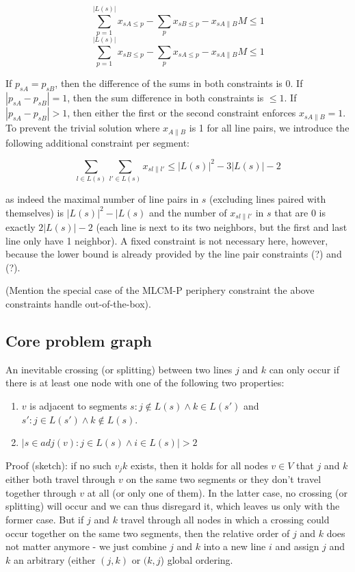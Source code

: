 \documentclass{llncs}
\begin{document}
$$\sum_{p=1}^{|L(s)|} x_{sA\leq p} - \sum_{p} x_{sB\leq p} - x_{sA\|B} M \leq 1$$
$$\sum_{p=1}^{|L(s)|} x_{sB\leq p} - \sum_{p} x_{sA\leq p} - x_{sA\|B} M \leq 1$$

If $p_{sA} = p_{sB}$, then the difference of the sums in both constraints is 0. If $|p_{sA} - p_{sB}| = 1$, then the sum difference in both constraints is $\leq 1$. If $|p_{sA} - p_{sB}| > 1$, then either the first or the second constraint enforces $x_{sA\|B} = 1$. To prevent the trivial solution where $x_{A\|B}$ is 1 for all line pairs, we introduce the following additional constraint per segment:

$$\sum_{l \in L(s)}\sum_{l' \in L(s)} x_{sl\|l'} \leq |L(s)|^2 - 3|L(s)| - 2$$

as indeed the maximal number of line pairs in $s$ (excluding lines paired with themselves) is $|L(s)|^2 - |L(s)$ and the number of $x_{sl\|l'}$ in $s$ that are 0 is exactly $2|L(s)| - 2$ (each line is next to its two neighbors, but the first and last line only have 1 neighbor). A fixed constraint is not necessary here, however, because the lower bound is already provided by the line pair constraints (?) and (?).

(Mention the special case of the MLCM-P periphery constraint the above constraints handle out-of-the-box).



%
\subsection{Core problem graph}
%

An inevitable crossing (or splitting) between two lines $j$ and $k$ can only occur if there is at least one node with one of the following two properties:
\begin{enumerate}
\item $v$ is adjacent to segments $s : j \not\in L(s) \land k \in L(s')$ and $s' : j \in L(s') \land k \not\in L(s)$.
\item $|{s \in adj(v) : j \in L(s) \land i \in L(s)}| > 2$
\end{enumerate}
Proof (sketch): if no such $v_jk$ exists, then it holds for all nodes $v \in V$ that $j$ and $k$ either both travel through $v$ on the same two segments or they don't travel together through $v$ at all (or only one of them). In the latter case, no crossing (or splitting) will occur and we can thus disregard it, which leaves us only with the former case. But if $j$ and $k$ travel through all nodes in which a crossing could occur together on the same two segments, then the relative order of $j$ and $k$ does not matter anymore - we just combine $j$ and $k$ into a new line $i$ and assign $j$ and $k$ an arbitrary (either $(j,k)$ or $(k, j$) global ordering.
\end{document}
